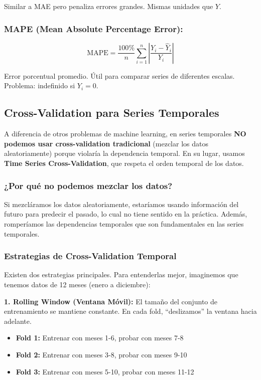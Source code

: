 \documentclass[12pt]{article}
\begin{document}
Similar a MAE pero penaliza errores grandes. Mismas unidades que $Y$.

\subsubsection{MAPE (Mean Absolute Percentage Error):}
\[
\text{MAPE} = \frac{100\%}{n} \sum_{i=1}^{n} \left|\frac{Y_i - \hat{Y}_i}{Y_i}\right|
\]

Error porcentual promedio. Útil para comparar series de diferentes escalas. Problema: indefinido si $Y_i = 0$.

\subsection{Cross-Validation para Series Temporales}

A diferencia de otros problemas de machine learning, en series temporales \textbf{NO podemos usar cross-validation tradicional} (mezclar los datos aleatoriamente) porque violaría la dependencia temporal. En su lugar, usamos \textbf{Time Series Cross-Validation}, que respeta el orden temporal de los datos.

\subsubsection{¿Por qué no podemos mezclar los datos?}

Si mezcláramos los datos aleatoriamente, estaríamos usando información del futuro para predecir el pasado, lo cual no tiene sentido en la práctica. Además, romperíamos las dependencias temporales que son fundamentales en las series temporales.

\subsubsection{Estrategias de Cross-Validation Temporal}

Existen dos estrategias principales. Para entenderlas mejor, imaginemos que tenemos datos de 12 meses (enero a diciembre):

\vspace{0.5em}

\textbf{1. Rolling Window (Ventana Móvil):} El tamaño del conjunto de entrenamiento se mantiene constante. En cada fold, ``deslizamos'' la ventana hacia adelante.

\begin{itemize}
    \item \textbf{Fold 1:} Entrenar con meses 1-6, probar con meses 7-8
    \item \textbf{Fold 2:} Entrenar con meses 3-8, probar con meses 9-10
    \item \textbf{Fold 3:} Entrenar con meses 5-10, probar con meses 11-12
\end{itemize}
\end{document}
